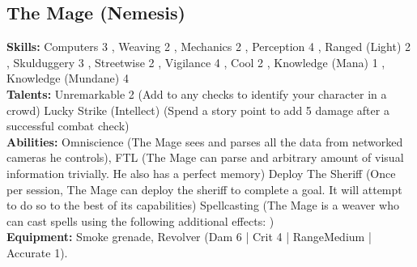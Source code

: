 \documentclass{article}
\begin{document}
\begin{multicols}{2}
{\subsection{The Mage (Nemesis)}
\begin{center}
\end{center}
\textbf{Skills:}
Computers 3 \Yellow[3]\Green[2],
Weaving 2 \Yellow[2]\Green[3],
Mechanics 2 \Yellow[2]\Green[3],
Perception 4 \Yellow[2]\Green[2],
Ranged (Light) 2 \Yellow[2],
Skulduggery 3 \Yellow[2]\Green[1],
Streetwise 2 \Yellow[2],
Vigilance 4 \Yellow[4],
Cool 2 \Yellow[2]\Green[2],
Knowledge (Mana) 1 \Yellow[1]\Green[3],
Knowledge (Mundane) 4 \Yellow[4]
\\\textbf{Talents:}
Unremarkable 2 (Add \Failure\Failure to any checks to identify your character in a crowd)
Lucky Strike (Intellect) (Spend a story point to add 5 damage after a successful combat check)
\\\textbf{Abilities:}
Omniscience (The Mage sees and parses all the data from networked cameras he controls), FTL (The Mage can parse and arbitrary amount of visual information trivially. He also has a perfect memory)
Deploy The Sheriff (Once per session, The Mage can deploy the sheriff to complete a goal. It will attempt to do so to the best of its capabilities)
Spellcasting (The Mage is a weaver who can cast spells using the following additional effects: )
\\\textbf{Equipment:} Smoke grenade, Revolver (Dam 6 | Crit 4 | RangeMedium | Accurate 1).
}

\vbox{
}
\end{multicols}
\end{document}
